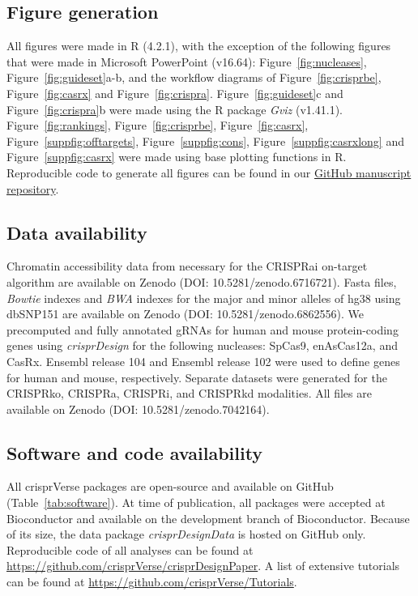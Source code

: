 \documentclass[pdftex,english,10pt]{article}
\begin{document}
{%

\subsection*{Figure generation}

All figures were made in R (4.2.1), with the exception of the following figures that were made in Microsoft PowerPoint (v16.64): Figure~\ref{fig:nucleases}, Figure~\ref{fig:guideset}a-b, and the workflow diagrams of Figure~\ref{fig:crisprbe}, Figure~\ref{fig:casrx} and Figure~\ref{fig:crispra}.  Figure~\ref{fig:guideset}c and Figure~\ref{fig:crispra}b were made using the R package \textit{Gviz} (v1.41.1). Figure~\ref{fig:rankings}, Figure~\ref{fig:crisprbe}, Figure~\ref{fig:casrx}, Figure~\ref{suppfig:offtargets}, Figure~\ref{suppfig:cons}, Figure~\ref{suppfig:casrxlong} and Figure~\ref{suppfig:casrx} were made using base plotting functions in R. Reproducible code to generate all figures can be found in our \href{https://github.com/crisprVerse/crisprVersePaper}{GitHub manuscript repository}. 





\subsection*{Data availability}

Chromatin accessibility data from \citet{crispria} necessary for the CRISPRai on-target algorithm are available on Zenodo (DOI: 10.5281/zenodo.6716721).
Fasta files, \textit{Bowtie} indexes and \textit{BWA} indexes for the major and minor alleles of hg38 using dbSNP151 are available on Zenodo (DOI: 10.5281/zenodo.6862556).
We precomputed and fully annotated gRNAs for human and mouse protein-coding genes using \textit{crisprDesign} for the following nucleases: SpCas9, enAsCas12a, and CasRx. Ensembl release 104 and Ensembl release 102 were used to define genes for human and mouse, respectively. Separate datasets were generated for the CRISPRko, CRISPRa, CRISPRi, and CRISPRkd modalities. All files are available on Zenodo (DOI: 10.5281/zenodo.7042164). 




\subsection*{Software and code availability}

All crisprVerse packages are open-source and available on GitHub (Table~\ref{tab:software}).
At time of publication, all packages were accepted at Bioconductor and available on the development branch of Bioconductor.
Because of its size, the data package \textit{crisprDesignData} is hosted on GitHub only. 
Reproducible code of all analyses can be found at \url{https://github.com/crisprVerse/crisprDesignPaper}.
A list of extensive tutorials can be found at \url{https://github.com/crisprVerse/Tutorials}.

}
\end{document}
